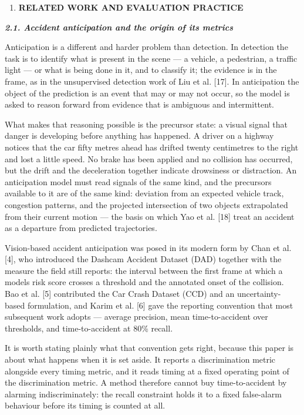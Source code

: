\begin{enumerate}
\def\labelenumi{\arabic{enumi}.}
\item
  \textbf{RELATED WORK AND EVALUATION PRACTICE}
\end{enumerate}

\emph{\textbf{2.1. Accident anticipation and the origin of its metrics}}

Anticipation is a different and harder problem than detection. In detection the task is to identify what is present in the scene --- a vehicle, a pedestrian, a traffic light --- or what is being done in it, and to classify it; the evidence is in the frame, as in the unsupervised detection work of Liu et al. {[}17{]}. In anticipation the object of the prediction is an event that may or may not occur, so the model is asked to reason forward from evidence that is ambiguous and intermittent.

What makes that reasoning possible is the precursor state: a visual signal that danger is developing before anything has happened. A driver on a highway notices that the car fifty metres ahead has drifted twenty centimetres to the right and lost a little speed. No brake has been applied and no collision has occurred, but the drift and the deceleration together indicate drowsiness or distraction. An anticipation model must read signals of the same kind, and the precursors available to it are of the same kind: deviation from an expected vehicle track, congestion patterns, and the projected intersection of two objects extrapolated from their current motion --- the basis on which Yao et al. {[}18{]} treat an accident as a departure from predicted trajectories.

Vision-based accident anticipation was posed in its modern form by Chan et al. {[}4{]}, who introduced the Dashcam Accident Dataset (DAD) together with the measure the field still reports: the interval between the first frame at which a model\textquotesingle s risk score crosses a threshold and the annotated onset of the collision. Bao et al. {[}5{]} contributed the Car Crash Dataset (CCD) and an uncertainty-based formulation, and Karim et al. {[}6{]} gave the reporting convention that most subsequent work adopts --- average precision, mean time-to-accident over thresholds, and time-to-accident at 80\% recall.

It is worth stating plainly what that convention gets right, because this paper is about what happens when it is set aside. It reports a discrimination metric alongside every timing metric, and it reads timing at a fixed operating point of the discrimination metric. A method therefore cannot buy time-to-accident by alarming indiscriminately: the recall constraint holds it to a fixed false-alarm behaviour before its timing is counted at all.

